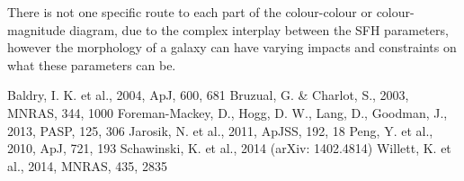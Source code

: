 \documentclass{mn2e}
\begin{document}
There is not one specific route to each part of the colour-colour or colour-magnitude diagram, due to the complex interplay between the SFH parameters, however the morphology of a galaxy can have varying impacts and constraints on what these parameters can be.

\begin{thebibliography}{}
 Baldry, I. K. et al., 2004, ApJ, 600, 681
 Bruzual, G. \& Charlot, S., 2003, MNRAS, 344, 1000
 Foreman-Mackey, D., Hogg, D. W., Lang, D., Goodman, J., 2013, PASP, 125, 306
 Jarosik, N. et al., 2011, ApJSS, 192, 18
 Peng, Y. et al., 2010, ApJ, 721, 193
 Schawinski, K. et al., 2014 (arXiv: 1402.4814)
 Willett, K. et al., 2014, MNRAS, 435, 2835
\end{thebibliography}
\end{document}
